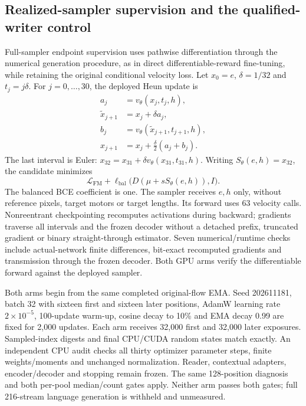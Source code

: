 \subsection*{Realized-sampler supervision and the qualified-writer control}
Full-sampler endpoint supervision uses pathwise differentiation through the
numerical generation procedure, as in direct differentiable-reward
fine-tuning\cite{draft}, while retaining the original conditional velocity
loss\cite{flowmatching}. Let $x_0=e$, $\delta=1/32$ and $t_j=j\delta$.
For $j=0,\ldots,30$, the deployed Heun update is
\begin{align}
 a_j&=v_\theta(x_j,t_j,h),\\
 \widetilde x_{j+1}&=x_j+\delta a_j,\\
 b_j&=v_\theta(\widetilde x_{j+1},t_{j+1},h),\\
 x_{j+1}&=x_j+\tfrac{\delta}{2}(a_j+b_j).
\end{align}
The last interval is Euler: $x_{32}=x_{31}+\delta
v_\theta(x_{31},t_{31},h)$. Writing $S_\theta(e,h)=x_{32}$, the candidate
minimizes
\[
 \mathcal L_\mathrm{FM}+\ell_\mathrm{bal}
 \bigl(D(\mu+sS_\theta(e,h)),I\bigr).
\]
The balanced BCE coefficient is one. The sampler receives $e,h$ only, without
reference pixels, target motors or target lengths. Its forward uses 63
velocity calls. Nonreentrant checkpointing recomputes activations during
backward; gradients traverse all intervals and the frozen decoder without a
detached prefix, truncated gradient or binary straight-through estimator.
Seven numerical/runtime checks include actual-network finite differences,
bit-exact recomputed gradients and transmission through the frozen decoder.
Both GPU arms verify the differentiable forward against the deployed sampler.

Both arms begin from the same completed original-flow EMA. Seed 202611181,
batch 32 with sixteen first and sixteen later positions, AdamW learning rate
$2\times10^{-5}$, 100-update warm-up, cosine decay to 10\% and EMA decay 0.99
are fixed for 2,000 updates. Each arm receives 32,000 first and 32,000 later
exposures. Sampled-index digests and final CPU/CUDA random states match exactly.
An independent CPU audit checks all thirty optimizer parameter steps, finite
weights/moments and unchanged normalization. Reader, contextual adapters,
encoder/decoder and stopping remain frozen. The same 128-position diagnosis
and both per-pool median/count gates apply. Neither arm passes both gates;
full 216-stream language generation is withheld and unmeasured.

